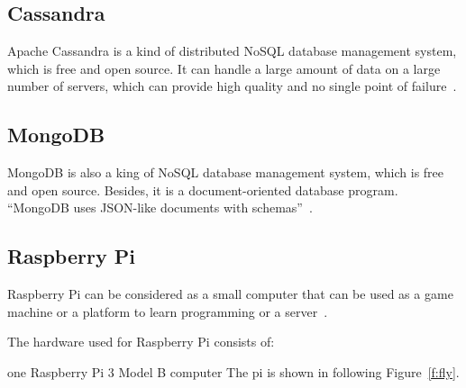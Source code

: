 \subsection{Cassandra}
Apache Cassandra is a kind of distributed NoSQL database management 
system, which is free and open source. It can handle a large amount of 
data on a large number of servers, which can provide high quality and no 
single point of failure~\cite{hid-sp18-508-cassandra}. 

\subsection{MongoDB}
MongoDB is also a king of NoSQL database management system, which 
is free and open source. Besides, it is a document-oriented database 
program. ``MongoDB uses JSON-like documents with 
schemas''~\cite{hid-sp18-508-mongodb}.

\subsection{Raspberry Pi}
Raspberry Pi can be considered as a small computer that can be used 
as a game machine or a platform to learn programming or a 
server~\cite{hid-sp18-508-raspberryPi}.

The hardware used for Raspberry Pi consists of: 

one Raspberry Pi 3 Model B computer
The pi is shown in following Figure~\ref{f:fly}.

